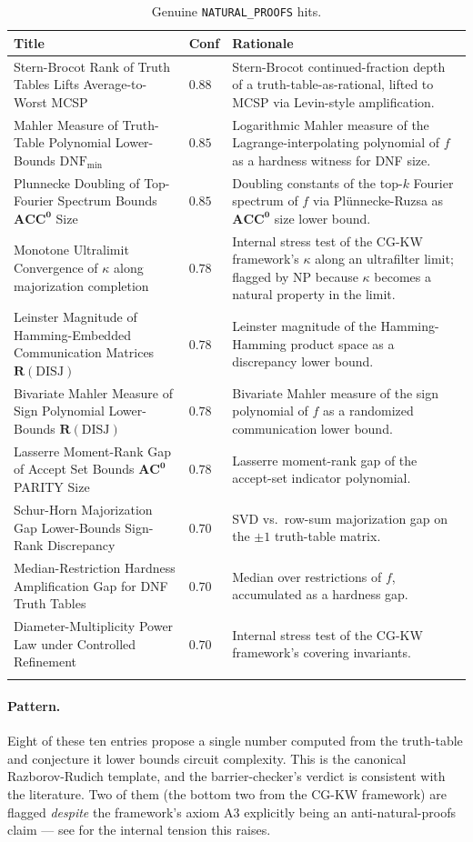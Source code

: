 \documentclass[11pt,a4paper]{article}
\begin{document}
\begin{longtable}{p{3.0cm} p{0.8cm} p{10.5cm}}
\toprule
Title & Conf & Rationale \\
\midrule
Stern-Brocot Rank of Truth Tables Lifts Average-to-Worst MCSP & $0.88$ & Stern-Brocot continued-fraction depth of a truth-table-as-rational, lifted to MCSP via Levin-style amplification. \\
Mahler Measure of Truth-Table Polynomial Lower-Bounds $\mathrm{DNF}_{\min}$ & $0.85$ & Logarithmic Mahler measure of the Lagrange-interpolating polynomial of $f$ as a hardness witness for DNF size. \\
Plunnecke Doubling of Top-Fourier Spectrum Bounds $\mathbf{ACC^0}$ Size & $0.85$ & Doubling constants of the top-$k$ Fourier spectrum of $f$ via Plünnecke-Ruzsa as $\mathbf{ACC^0}$ size lower bound. \\
Monotone Ultralimit Convergence of $\kappa$ along majorization completion & $0.78$ & Internal stress test of the CG-KW framework's $\kappa$ along an ultrafilter limit; flagged by NP because $\kappa$ becomes a natural property in the limit. \\
Leinster Magnitude of Hamming-Embedded Communication Matrices $\mathbf{R}(\mathrm{DISJ})$ & $0.78$ & Leinster magnitude of the Hamming-Hamming product space as a discrepancy lower bound. \\
Bivariate Mahler Measure of Sign Polynomial Lower-Bounds $\mathbf{R}(\mathrm{DISJ})$ & $0.78$ & Bivariate Mahler measure of the sign polynomial of $f$ as a randomized communication lower bound. \\
Lasserre Moment-Rank Gap of Accept Set Bounds $\mathbf{AC^0}$ PARITY Size & $0.78$ & Lasserre moment-rank gap of the accept-set indicator polynomial. \\
Schur-Horn Majorization Gap Lower-Bounds Sign-Rank Discrepancy & $0.70$ & SVD vs.\ row-sum majorization gap on the $\pm 1$ truth-table matrix. \\
Median-Restriction Hardness Amplification Gap for DNF Truth Tables & $0.70$ & Median over restrictions of $f$, accumulated as a hardness gap. \\
Diameter-Multiplicity Power Law under Controlled Refinement & $0.70$ & Internal stress test of the CG-KW framework's covering invariants. \\
\bottomrule
\caption{Genuine \texttt{NATURAL\_PROOFS} hits.}\label{tab:np-genuine}
\end{longtable}

\paragraph{Pattern.} Eight of these ten entries propose
a single number computed from the truth-table and conjecture it lower
bounds circuit complexity. This is the canonical Razborov-Rudich
template, and the barrier-checker's verdict is consistent with the
literature. Two of them (the bottom two from the CG-KW framework) are
flagged \emph{despite} the framework's axiom A3 explicitly being an
anti-natural-proofs claim — see \cite{KublerCGKW2026} for the
internal tension this raises.
\end{document}
